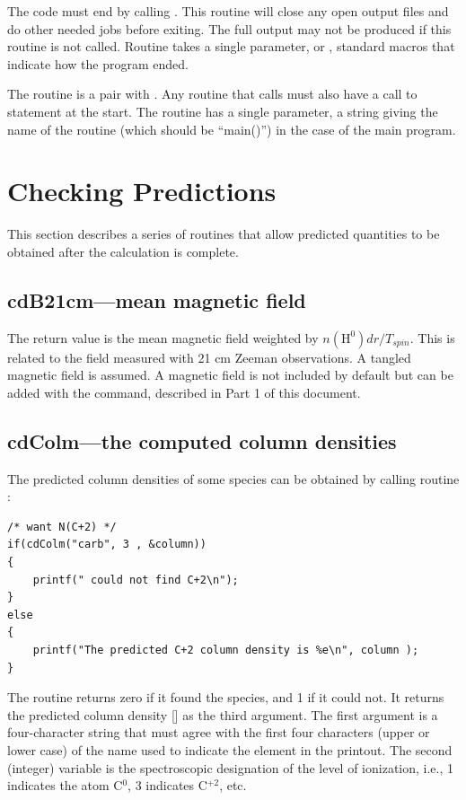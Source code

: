 The code must end by calling .
This routine will close any open
output files and do other needed jobs before exiting.
The full output may
not be produced if this routine is not called.
Routine  takes a single
parameter,  or ,
standard macros that indicate how
the program ended.

The routine  is a pair with .
Any routine that calls
 must also have a call to  statement at the start.  The
routine  has a single parameter, a string giving the name of
the routine (which should be ``main()'') in the case of the main program.

\section{Checking Predictions}

This section describes a series of routines that allow predicted
quantities to be obtained after the calculation is complete.

\subsection{cdB21cm---mean magnetic field}

The return value is the mean magnetic field weighted by
$n(\mathrm{H}^0) dr/T_{spin}$.
This is related to the field measured with 21 cm Zeeman
observations.
A tangled magnetic field is assumed.
A magnetic field is
not included by default but can be added with the
 command, described in Part 1 of this document.

\subsection{cdColm---the computed column densities }
\label{sec:SubroutineCdColm}

The predicted column densities of some species can be obtained by
calling routine :
\begin{verbatim}
/* want N(C+2) */
if(cdColm("carb", 3 , &column))
{
    printf(" could not find C+2\n");
}
else
{
    printf("The predicted C+2 column density is %e\n", column );
}
\end{verbatim}
The routine returns zero if it found the species, and 1 if it could not.
It returns the predicted column density [\pscm] as the third argument.  The
first argument  is a four-character string that must agree with the
first four characters (upper or lower case) of the name used to indicate
the element in the printout.
The second (integer) variable  is the
spectroscopic designation of the level of ionization, i.e., 1 indicates
the atom C$^0$, 3 indicates C$^{+2}$, etc.

